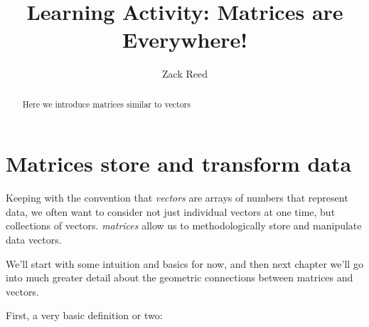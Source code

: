 \documentclass{ximera}
\author{Zack Reed} %
\title{Learning Activity: Matrices are Everywhere!}
\begin{document}
\begin{abstract}
Here we introduce matrices similar to vectors
\end{abstract}
\maketitle


\section{Matrices store and transform data}

Keeping with the convention that \emph{vectors} are arrays of numbers that represent data, we often want to consider not just individual vectors at one time, but collections of vectors. \emph{matrices} allow us to methodologically store and manipulate data vectors.

We'll start with some intuition and basics for now, and then next chapter we'll go into much greater detail about the geometric connections between matrices and vectors.

First, a very basic definition or two:
\end{document}
